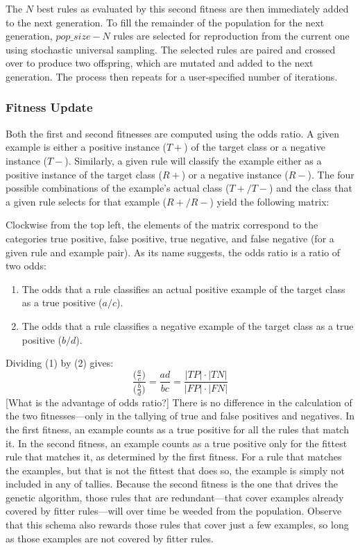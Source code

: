 \documentclass[11pt]{article}
\begin{document}
The $N$ best rules as evaluated by this second fitness are then immediately added to the next generation. To fill the remainder of the population for the next generation, $pop\_size - N$ rules are selected for reproduction from the current one using stochastic universal sampling. The selected rules are paired and crossed over to produce two offspring, which are mutated and added to the next generation. The process then repeats for a user-specified number of iterations.

\subsubsection*{Fitness Update}

Both the first and second fitnesses are computed using the odds ratio. A given example is either a positive instance ($T+$) of the target class or a negative instance ($T-$). Similarly, a given rule will classify the example either as a positive instance of the target class ($R+$) or a negative instance ($R-$). The four possible combinations of the example’s actual class ($T+/T-$) and the class that a given rule selects for that example ($R+/R-$) yield the following matrix:

Clockwise from the top left, the elements of the matrix correspond to the categories true positive, false positive, true negative, and false negative (for a given rule and example pair). As its name suggests, the odds ratio is a ratio of two odds:

\begin{enumerate}
\item The odds that a rule classifies an actual positive example of the target class as a true positive ($a/c$).
\item The odds that a rule classifies a negative example of the target class as a true positive ($b/d$).
\end{enumerate}
Dividing (1) by (2) gives:
$$\frac{\Big(\frac{a}{c}\Big)}{\Big(\frac{b}{d}\Big)} = \frac{ad}{bc} = \frac{|TP| \cdot |TN|}{|FP| \cdot |FN|}$$
[What is the advantage of odds ratio?]  There is no difference in the calculation of the two fitnesses––only in the tallying of true and false positives and negatives. In the first fitness, an example counts as a true positive for all the rules that match it. In the second fitness, an example counts as a true positive only for the fittest rule that matches it, as determined by the first fitness. For a rule that matches the examples, but that is not the fittest that does so, the example is simply not included in any of tallies. Because the second fitness is the one that drives the genetic algorithm, those rules that are redundant––that cover examples already covered by fitter rules––will over time be weeded from the population. Observe that this schema also rewards those rules that cover just a few examples, so long as those examples are not covered by fitter rules.
\end{document}
